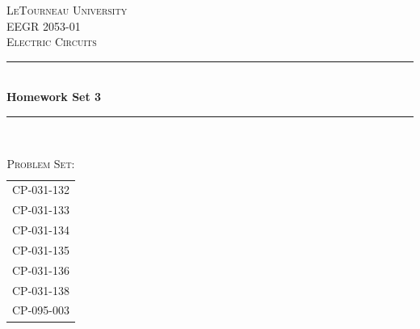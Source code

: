 \begin{titlepage}
\newcommand{\HRule}{\rule{\linewidth}{0.4mm}} %

\center %
 

\textsc{\LARGE LeTourneau University}\\[1.5cm] %
\textsc{\Large EEGR 2053-01}\\[0.5cm] %
\textsc{\large Electric Circuits}\\[0.5cm] %


\HRule \\[0.4cm]
{ \huge \bfseries Homework Set 3}\\[0.2cm] %
\HRule \\[1.5cm]
 

\begin{table}[h]
\large
\ttfamily
\centering
\caption*{\textsc{\large Problem Set:}}
\label{tab:probset}
\begin{tabular}{l}
CP-031-132 \\
CP-031-133 \\
CP-031-134 \\
CP-031-135 \\
CP-031-136 \\
CP-031-138 \\
CP-095-003 \\[1.5cm]
\end{tabular}
\end{table}



\end{titlepage}
